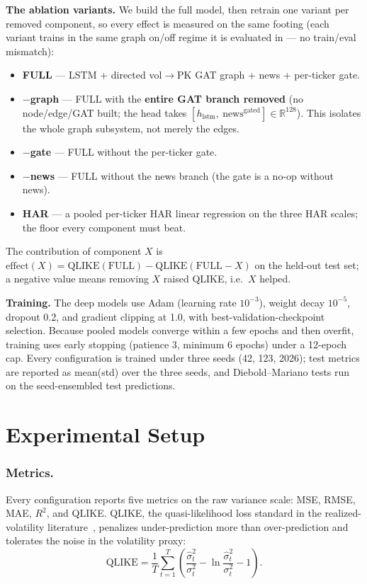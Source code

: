 \documentclass[runningheads]{llncs}
\begin{document}
\noindent\textbf{The ablation variants.} We build the full model, then retrain one variant per removed
component, so every effect is measured on the same footing (each variant trains in the same graph on/off
regime it is evaluated in --- no train/eval mismatch):
\begin{itemize}
\item \textbf{FULL} --- LSTM + directed vol$\to$PK GAT graph + news + per-ticker gate.
\item \textbf{$-$graph} --- FULL with the \textbf{entire GAT branch removed} (no node/edge/GAT built; the
head takes $[h_{\text{lstm}},\ \text{news}^{\text{gated}}]\in\mathbb{R}^{128}$). This isolates the whole
graph subsystem, not merely the edges.
\item \textbf{$-$gate} --- FULL without the per-ticker gate.
\item \textbf{$-$news} --- FULL without the news branch (the gate is a no-op without news).
\item \textbf{HAR} --- a pooled per-ticker HAR linear regression on the three HAR scales; the floor every
component must beat.
\end{itemize}
The contribution of component $X$ is
$\text{effect}(X)=\text{QLIKE}(\text{FULL})-\text{QLIKE}(\text{FULL}{-}X)$ on the held-out test set; a
negative value means removing $X$ raised QLIKE, i.e.\ $X$ helped.

\noindent\textbf{Training.} The deep models use Adam (learning rate $10^{-3}$), weight decay $10^{-5}$,
dropout 0.2, and gradient clipping at 1.0, with best-validation-checkpoint selection. Because pooled models
converge within a few epochs and then overfit, training uses early stopping (patience 3, minimum 6 epochs)
under a 12-epoch cap. Every configuration is trained under three seeds (42, 123, 2026); test metrics are
reported as mean(std) over the three seeds, and Diebold--Mariano tests run on the seed-ensembled test
predictions.

\section{Experimental Setup}
\label{sec:setup}
\subsubsection{Metrics.}
Every configuration reports five metrics on the raw variance scale: MSE, RMSE, MAE, $R^2$, and QLIKE.
QLIKE, the quasi-likelihood loss standard in the realized-volatility literature~\cite{patton2011},
penalizes under-prediction more than over-prediction and tolerates the noise in the volatility proxy:
\begin{equation}
\text{QLIKE} = \frac{1}{T}\sum_{t=1}^{T}\left(\frac{\hat{\sigma}^2_t}{\sigma^2_t}
 - \ln\frac{\hat{\sigma}^2_t}{\sigma^2_t} - 1\right).
\label{eq:qlike}
\end{equation}
\end{document}
